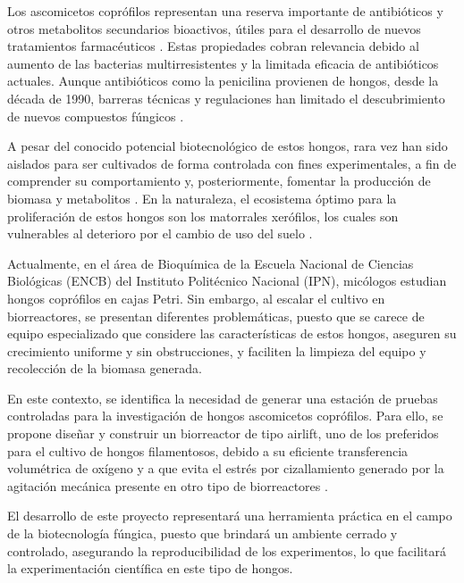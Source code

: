 \documentclass[11pt,tesis,twoside,openright,spanish]{upiiztt}
\begin{document}
Los ascomicetos coprófilos representan una reserva importante de antibióticos y
otros metabolitos secundarios bioactivos, útiles para el desarrollo de nuevos
tratamientos farmacéuticos \cite{Bills2013}. Estas propiedades cobran relevancia debido al
aumento de las bacterias multirresistentes y la limitada eficacia de antibióticos
actuales. Aunque antibióticos como la penicilina provienen de hongos, desde la
década de 1990, barreras técnicas y regulaciones han limitado el descubrimiento
de nuevos compuestos fúngicos \cite{Correia2023}.

A pesar del conocido potencial biotecnológico de estos hongos, rara vez han sido
aislados para ser cultivados de forma controlada con fines experimentales, a fin de
comprender su comportamiento y, posteriormente, fomentar la producción de
biomasa y metabolitos \cite{MarinFelix}. En la naturaleza, el ecosistema óptimo para la
proliferación de estos hongos son los matorrales xerófilos, los cuales son
vulnerables al deterioro por el cambio de uso del suelo \cite{Sanchez2004}.

Actualmente, en el área de Bioquímica de la Escuela Nacional de Ciencias
Biológicas (ENCB) del Instituto Politécnico Nacional (IPN), micólogos estudian
hongos coprófilos en cajas Petri. Sin embargo, al escalar el cultivo en biorreactores,
se presentan diferentes problemáticas, puesto que se carece de equipo
especializado que considere las características de estos hongos, aseguren su
crecimiento uniforme y sin obstrucciones, y faciliten la limpieza del equipo y
recolección de la biomasa generada.

En este contexto, se identifica la necesidad de generar una estación de pruebas
controladas para la investigación de hongos ascomicetos coprófilos. Para ello, se
propone diseñar y construir un biorreactor de tipo airlift, uno de los preferidos para
el cultivo de hongos filamentosos, debido a su eficiente transferencia volumétrica
de oxígeno y a que evita el estrés por cizallamiento generado por la agitación
mecánica presente en otro tipo de biorreactores \cite{Cerrone2025}.

El desarrollo de este proyecto representará una herramienta práctica en el campo
de la biotecnología fúngica, puesto que brindará un ambiente cerrado y controlado,
asegurando la reproducibilidad de los experimentos, lo que facilitará la
experimentación científica en este tipo de hongos.

\end{document}
